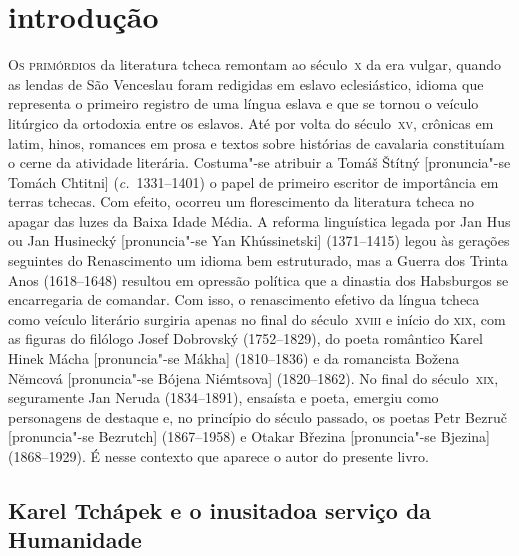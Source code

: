 
\chapter[Introdução, por Aleksandar Jovanović]{introdução}


\textsc{Os primórdios} da literatura tcheca remontam ao século~\textsc{x} da era vulgar,
quando as lendas de São Venceslau foram redigidas em eslavo eclesiástico,
idioma que representa o primeiro registro de uma língua eslava e que se tornou
o veículo litúrgico da ortodoxia entre os eslavos. Até por volta do século~\textsc{xv},
crônicas em latim, hinos, romances em prosa e textos sobre histórias de
cavalaria constituíam o cerne da atividade literária. Costuma"-se atribuir a
Tomáš Št\'{i}tný [pronuncia"-se Tomách Chtitni] (\textit{c.}~1331--1401) o papel
de primeiro escritor de importância em terras tchecas. Com efeito, ocorreu um
florescimento da literatura tcheca no apagar das luzes da Baixa Idade Média. A
reforma linguística legada por Jan Hus ou Jan Husinecký [pronuncia"-se Yan
Khússinetski] (1371--1415) legou às gerações seguintes do Renascimento um
idioma bem estruturado, mas a Guerra dos Trinta Anos (1618--1648) resultou em
opressão política que a dinastia dos Habsburgos se encarregaria de comandar.
Com isso, o renascimento efetivo da língua tcheca como veículo literário
surgiria apenas no final do século~\textsc{xviii} e início do \textsc{xix}, com as figuras do
filólogo Josef Dobrovský (1752--1829), do poeta romântico Karel Hinek Mácha
[pronuncia"-se Mákha] (1810--1836) e da romancista Božena N\u{e}mcová
[pronuncia"-se Bójena Niémtsova] (1820--1862). No final do século~\textsc{xix},
seguramente Jan Neruda (1834--1891), ensaísta e poeta, emergiu como personagens
de destaque e, no princípio do século passado, os poetas Petr Bezruč
[pronuncia"-se Bezrutch] (1867--1958) e Otakar Březina [pronuncia"-se Bjezina]
(1868--1929). É nesse contexto que aparece o autor do presente livro.

\section{Karel Tchápek e o inusitado\break a serviço da Humanidade}

